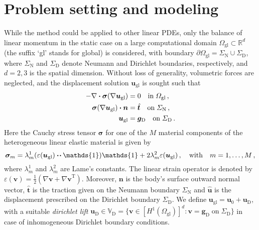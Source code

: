 \documentclass[AMA,STIX1COL,doublespace]{WileyNJD-v2}
\begin{document}
\section{Problem setting and modeling}%
\label{sec:problem_setting_and_modeling}
While the method could be applied to other linear PDEs, only the balance of linear momentum in the static case on a large computational domain $\varOmega_{\mathrm{gl}} \subset\mathbb{R}^d$ (the suffix `gl' stands for global) is considered, with boundary $\partial\varOmega_{\mathrm{gl}} = \varSigma_{\mathrm{N}}\cup\varSigma_{\mathrm{D}}$, where $\varSigma_{\mathrm{N}}$ and $\varSigma_{\mathrm{D}}$ denote Neumann and Dirichlet boundaries, respectively, and $d=2, 3$ is the spatial dimension.
Without loss of generality, volumetric forces are neglected, and the displacement solution $\bm{u}_{\mathrm{gl}}$ is sought such that
\begin{align}
    \label{eq:strong_bvp}
    \begin{split}
	    - \nabla \vdot \bm{\sigma} (\nabla\bm{u}_{\mathrm{gl}}) &= 0 \quad  \mathrm{in}\;\varOmega_{\mathrm{gl}}\,,\\
	    \bm{\sigma}(\nabla\bm{u}_{\mathrm{gl}}) \vdot \bm{n} &= \hat{\bm{t}} \quad \mathrm{on}\; \varSigma_{\mathrm{N}}\,,\\
	    \bm{u}_{\mathrm{gl}} &= \bm{g}_{\mathrm{D}} \quad  \mathrm{on}\;\varSigma_{\mathrm{D}}\,.
    \end{split}
\end{align}
Here the Cauchy stress tensor $\bm\sigma$ for one of the $M$ material components of the heterogeneous linear elastic material
is given by
\begin{equation}
	\label{eq:hooke}
	\bm{\sigma}_m = \lambda^1_m ({\varepsilon}(\bm{u}_{\mathrm{gl}}) \vdot\!\vdot\, \mathds{1}) \mathds{1} + 2 \lambda^2_m {\varepsilon}(\bm{u}_{\mathrm{gl}})\,, \quad \mathrm{with} \quad
	m=1, \ldots, M\,,
\end{equation}
where $\lambda_m^1$ and $\lambda_m^2$ are Lame's constants.
The linear strain operator is denoted by ${\varepsilon}(\bm{v}) = \frac{1}{2}\left(\nabla\bm{v} + {\nabla\bm{v}}^{\mathrm{T}}\right)$.
Moreover, $\bm{n}$ is the body's surface outward normal vector, $\hat{\bm{t}}$ is the traction given on the Neumann boundary $\varSigma_{\mathrm{N}}$ and $\hat{\bm{u}}$ is the displacement prescribed on the Dirichlet boundary $\varSigma_{\mathrm{D}}$. 
We define $\bm{u}_{\mathrm{gl}}=\bm{u}_0+\bm{u}_{\mathrm{D}}$, with a suitable \textit{dirichlet lift} $\bm{u}_{\mathrm{D}}\in\mathbb{V}_{\mathrm{D}}=\{\bm{v}\in{[H^1(\varOmega_{\mathrm{gl}})]}^d: \bm{v}=\bm{g}_{\mathrm{D}}\;\mathrm{on}\;\Sigma_{\mathrm{D}}\}$ in case of inhomogeneous Dirichlet boundary conditions.
\end{document}
